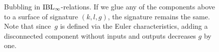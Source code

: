 \documentclass[\MainFolder/Text.tex]{subfiles}
\begin{document}
\begin{figure}
{%
%
%
%
Bubbling in $\mathrm{IBL}_\infty$-relations. If we glue any of the components above to a surface of signature $(k,l,g)$, the signature remains the same. Note that since~$g$ is defined via the Euler characteristics, adding a disconnected component without inputs and outputs decreases $g$ by one.}
\label{Fig:Bubbling}
\end{figure}
\end{document}
